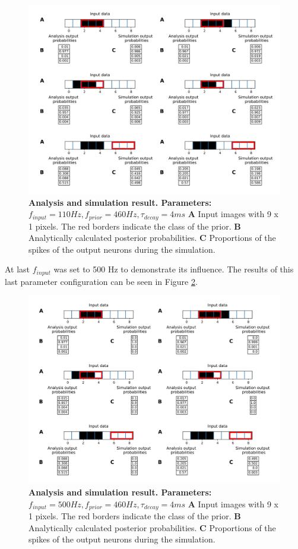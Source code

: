 \begin{figure}
  \includegraphics[width=\linewidth]{figures/1D/1D_110_460_4.png}
  \caption{\textbf{Analysis and simulation result. Parameters: }$f_{input} = 110 Hz, f_{prior} = 460 Hz, \tau_{decay} = 4 ms$ \textbf{A} Input images with 9 x 1 pixels. The red borders indicate the class of the prior. \textbf{B} Analytically calculated posterior probabilities. \textbf{C} Proportions of the spikes of the output neurons during the simulation.}
  \label{fig:1D_110_460_4}
\end{figure}

At last $f_{input}$ was set to 500 Hz to demonstrate its influence. The results of this last parameter configuration can be seen in Figure \ref{fig:1D_500_460_4}.

\begin{figure}
  \includegraphics[width=\linewidth]{figures/1D/1D_500_460_4.png}
  \caption{\textbf{Analysis and simulation result. Parameters: }$f_{input} = 500 Hz, f_{prior} = 460 Hz, \tau_{decay} = 4 ms$ \textbf{A} Input images with 9 x 1 pixels. The red borders indicate the class of the prior. \textbf{B} Analytically calculated posterior probabilities. \textbf{C} Proportions of the spikes of the output neurons during the simulation.}
  \label{fig:1D_500_460_4}
\end{figure}

